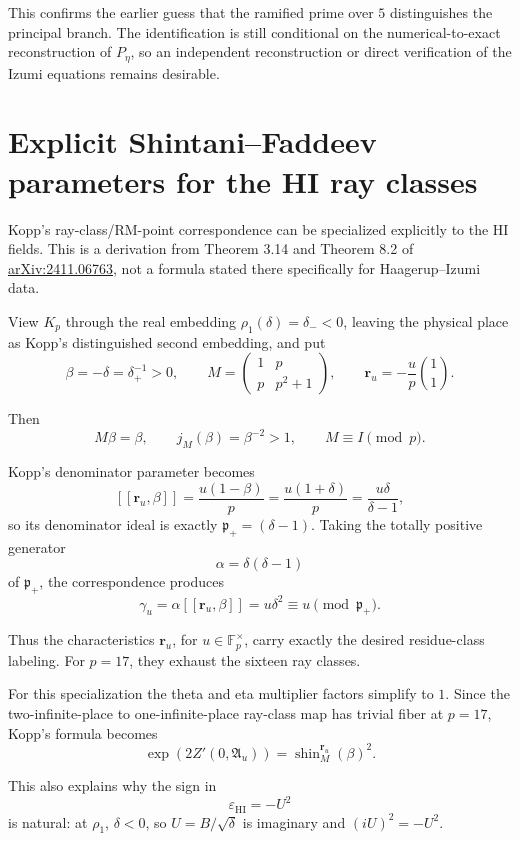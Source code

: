 \documentclass[11pt,reqno]{amsart}
\theoremstyle{plain}
\begin{document}
This confirms the earlier guess that the ramified prime over \(5\) distinguishes the principal branch. The identification is still conditional on the numerical-to-exact reconstruction of \(P_\eta\), so an independent reconstruction or direct verification of the Izumi equations remains desirable.

\section{Explicit Shintani--Faddeev parameters for the HI ray classes}\label{sec:23}

Kopp's ray-class/RM-point correspondence can be specialized explicitly to the HI fields. This is a derivation from Theorem 3.14 and Theorem 8.2 of \href{https://arxiv.org/abs/2411.06763}{arXiv:2411.06763}, not a formula stated there specifically for Haagerup--Izumi data.

View \(K_p\) through the real embedding \(\rho_1(\delta)=\delta_-<0\), leaving the physical place as Kopp's distinguished second embedding, and put
\[
\beta=-\delta=\delta_+^{-1}>0,
\qquad
M=\begin{pmatrix}1&p\\p&p^2+1\end{pmatrix},
\qquad
\mathbf r_u=-\frac{u}{p}\binom11.
\]

Then
\[
M\beta=\beta,
\qquad
j_M(\beta)=\beta^{-2}>1,
\qquad
M\equiv I\pmod p.
\]

Kopp's denominator parameter becomes
\[
[[\mathbf r_u,\beta]]
=\frac{u(1-\beta)}p
=\frac{u(1+\delta)}p
=\frac{u\delta}{\delta-1},
\]
so its denominator ideal is exactly \(\mathfrak p_+=(\delta-1)\). Taking the totally positive generator
\[
\alpha=\delta(\delta-1)
\]
of \(\mathfrak p_+\), the correspondence produces
\[
\gamma_u
=\alpha[[\mathbf r_u,\beta]]
=u\delta^2
\equiv u\pmod{\mathfrak p_+}.
\]

Thus the characteristics \(\mathbf r_u\), for \(u\in\mathbb F_p^\times\), carry exactly the desired residue-class labeling. For \(p=17\), they exhaust the sixteen ray classes.

For this specialization the theta and eta multiplier factors simplify to \(1\). Since the two-infinite-place to one-infinite-place ray-class map has trivial fiber at \(p=17\), Kopp's formula becomes
\[
\exp\!\left(2Z'(0,\mathfrak A_u)\right)
=
\operatorname{shin}^{\mathbf r_u}_M(\beta)^2.
\]

This also explains why the sign in
\[
\varepsilon_{\mathrm{HI}}=-U^2
\]
is natural: at \(\rho_1\), \(\delta<0\), so \(U=B/\sqrt\delta\) is imaginary and \((iU)^2=-U^2\).
\end{document}

